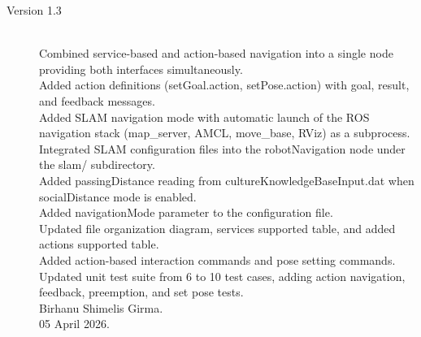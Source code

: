 \documentclass{CSSRforAfrica}
\begin{document}
\begin{description}
	\item [Version 1.3]~\\
	Combined service-based and action-based navigation into a single node providing both interfaces simultaneously. \\
	Added action definitions (setGoal.action, setPose.action) with goal, result, and feedback messages. \\
	Added SLAM navigation mode with automatic launch of the ROS navigation stack (map\_server, AMCL, move\_base, RViz) as a subprocess. \\
	Integrated SLAM configuration files into the robotNavigation node under the slam/ subdirectory. \\
	Added passingDistance reading from cultureKnowledgeBaseInput.dat when socialDistance mode is enabled. \\
	Added navigationMode parameter to the configuration file. \\
	Updated file organization diagram, services supported table, and added actions supported table. \\
	Added action-based interaction commands and pose setting commands. \\
	Updated unit test suite from 6 to 10 test cases, adding action navigation, feedback, preemption, and set pose tests. \\
	Birhanu Shimelis Girma. \\
	05 April 2026.

\end{description}
\end{document}
